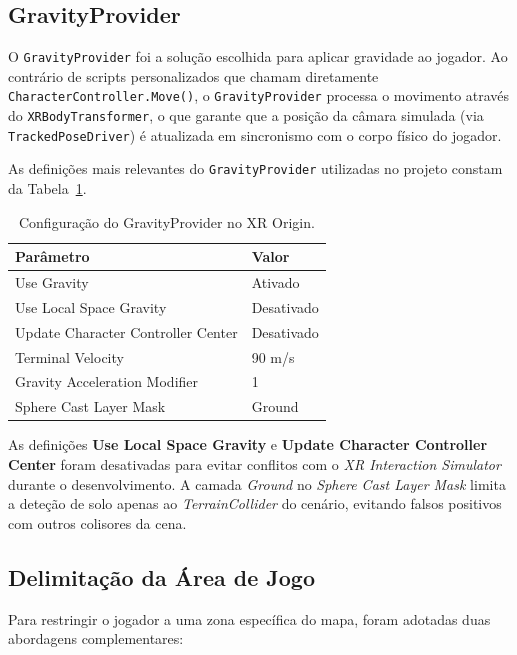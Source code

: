 \documentclass[a4paper,11pt]{report}
\newcommand{\code}[1]{\texttt{#1}}
\begin{document}
\subsection{GravityProvider}

O \code{GravityProvider} foi a solução escolhida para aplicar gravidade ao
jogador. Ao contrário de scripts personalizados que chamam diretamente
\code{CharacterController.Move()}, o \code{GravityProvider} processa o
movimento através do \code{XRBodyTransformer}, o que garante que a posição
da câmara simulada (via \code{TrackedPoseDriver}) é atualizada em
sincronismo com o corpo físico do jogador.

As definições mais relevantes do \code{GravityProvider} utilizadas no
projeto constam da Tabela~\ref{tab:gravity}.

\begin{table}[H]
\centering
\begin{tabular}{ll}
\toprule
\textbf{Parâmetro} & \textbf{Valor} \\
\midrule
Use Gravity                    & Ativado \\
Use Local Space Gravity        & Desativado \\
Update Character Controller Center & Desativado \\
Terminal Velocity              & 90 m/s \\
Gravity Acceleration Modifier  & 1 \\
Sphere Cast Layer Mask         & Ground \\
\bottomrule
\end{tabular}
\caption{Configuração do GravityProvider no XR Origin.}
\label{tab:gravity}
\end{table}

As definições \textbf{Use Local Space Gravity} e
\textbf{Update Character Controller Center} foram desativadas para evitar
conflitos com o \textit{XR Interaction Simulator} durante o desenvolvimento.
A camada \textit{Ground} no \textit{Sphere Cast Layer Mask} limita a deteção
de solo apenas ao \textit{TerrainCollider} do cenário, evitando falsos
positivos com outros colisores da cena.

\subsection{Delimitação da Área de Jogo}

Para restringir o jogador a uma zona específica do mapa, foram adotadas
duas abordagens complementares:
\end{document}
